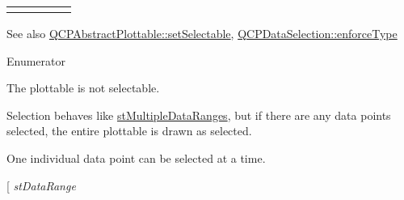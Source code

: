 \begin{center} \tabulinesep=1mm
\begin{longtabu} spread 0pt [c]{*5{|X[-1]}|}
\hline
 & & & &  \\
\end{longtabu}
\end{center} 

\begin{DoxySeeAlso}{See also}
\hyperlink{class_q_c_p_abstract_plottable_ac238d6e910f976f1f30d41c2bca44ac3}{Q\+C\+P\+Abstract\+Plottable\+::set\+Selectable}, \hyperlink{class_q_c_p_data_selection_a17b84d852911531d229f4a76aa239a75}{Q\+C\+P\+Data\+Selection\+::enforce\+Type} 
\end{DoxySeeAlso}
\begin{Desc}
\item[Enumerator]\par
\begin{description}
\item[{\em 
st\+None\hypertarget{namespace_q_c_p_ac6cb9db26a564b27feda362a438db038a2cb7996ccc6c39b9e6d20f2e46bf3f57}{}\label{namespace_q_c_p_ac6cb9db26a564b27feda362a438db038a2cb7996ccc6c39b9e6d20f2e46bf3f57}
}]The plottable is not selectable. \item[{\em 
st\+Whole\hypertarget{namespace_q_c_p_ac6cb9db26a564b27feda362a438db038a70734549f1745196a5b3ae8b8d158d52}{}\label{namespace_q_c_p_ac6cb9db26a564b27feda362a438db038a70734549f1745196a5b3ae8b8d158d52}
}]Selection behaves like \hyperlink{namespace_q_c_p_ac6cb9db26a564b27feda362a438db038ab68af6f04366b667f30f3bf1276eaf4f}{st\+Multiple\+Data\+Ranges}, but if there are any data points selected, the entire plottable is drawn as selected. \item[{\em 
st\+Single\+Data\hypertarget{namespace_q_c_p_ac6cb9db26a564b27feda362a438db038a83873962d48d31fa01ac36f859c00f67}{}\label{namespace_q_c_p_ac6cb9db26a564b27feda362a438db038a83873962d48d31fa01ac36f859c00f67}
}]One individual data point can be selected at a time. \item[{\em 
st\+Data\+Range\hypertarget{namespace_q_c_p_ac6cb9db26a564b27feda362a438db038a1db42782cc5852ace37e61244df1b7ad}{}\label{namespace_q_c_p_ac6cb9db26a564b27feda362a438db038a1db42782cc5852ace37e61244df1b7ad}
}
\end{description}
\end{Desc}
